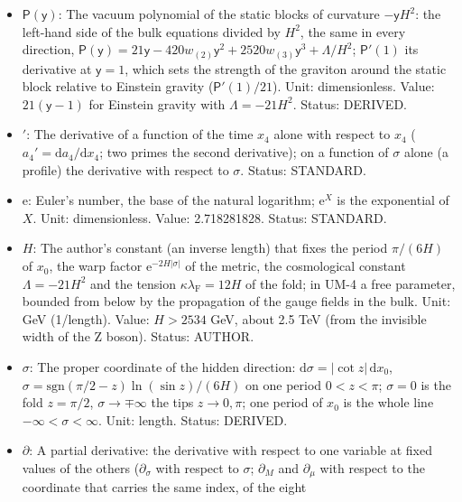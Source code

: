 \documentclass[
  10pt,
]{article}
\providecommand{\tightlist}{%
  \setlength{\itemsep}{0pt}\setlength{\parskip}{0pt}}
\begin{document}
\begin{itemize}
\tightlist
\item
  \(\mathsf{P}(\mathsf{y})\): The vacuum polynomial of the static blocks
  of curvature \(-\mathsf{y}H^2\): the left-hand side of the bulk
  equations divided by \(H^2\), the same in every direction,
  \(\mathsf{P}(\mathsf{y}) = 21\mathsf{y} - 420w_{(2)}\mathsf{y}^2 + 2520w_{(3)}\mathsf{y}^3 + \Lambda/H^2\);
  \(\mathsf{P}'(1)\) its derivative at \(\mathsf{y} = 1\), which sets
  the strength of the graviton around the static block relative to
  Einstein gravity (\(\mathsf{P}'(1)/21\)). Unit: dimensionless. Value:
  \(21(\mathsf{y} - 1)\) for Einstein gravity with \(\Lambda = -21H^2\).
  Status: DERIVED.
\item
  \({}'\): The derivative of a function of the time \(x_4\) alone with
  respect to \(x_4\) (\(a_4' = \mathrm{d}a_4/\mathrm{d}x_4\); two primes
  the second derivative); on a function of \(\sigma\) alone (a profile)
  the derivative with respect to \(\sigma\). Status: STANDARD.
\item
  \(\mathrm{e}\): Euler's number, the base of the natural logarithm;
  \(\mathrm{e}^{X}\) is the exponential of \(X\). Unit: dimensionless.
  Value: 2.718281828. Status: STANDARD.
\item
  \(H\): The author's constant (an inverse length) that fixes the period
  \(\pi/(6H)\) of \(x_0\), the warp factor
  \(\mathrm{e}^{-2H\lvert\sigma\rvert}\) of the metric, the cosmological
  constant \(\Lambda = -21H^2\) and the tension
  \(\kappa\lambda_{\mathrm{F}} = 12H\) of the fold; in UM-4 a free
  parameter, bounded from below by the propagation of the gauge fields
  in the bulk. Unit: GeV (1/length). Value: \(H > 2534\) GeV, about 2.5
  TeV (from the invisible width of the Z boson). Status: AUTHOR.
\item
  \(\sigma\): The proper coordinate of the hidden direction:
  \(\mathrm{d}\sigma = \lvert\cot z\rvert\,\mathrm{d}x_0\),
  \(\sigma = \mathrm{sgn}(\pi/2 - z)\ln(\sin z)/(6H)\) on one period
  \(0 < z < \pi\); \(\sigma = 0\) is the fold \(z = \pi/2\),
  \(\sigma \to \mp\infty\) the tips \(z \to 0, \pi\); one period of
  \(x_0\) is the whole line \(-\infty < \sigma < \infty\). Unit: length.
  Status: DERIVED.
\item
  \(\partial\): A partial derivative: the derivative with respect to one
  variable at fixed values of the others (\(\partial_\sigma\) with
  respect to \(\sigma\); \(\partial_M\) and \(\partial_\mu\) with
  respect to the coordinate that carries the same index, of the eight

\end{itemize}
\end{document}
